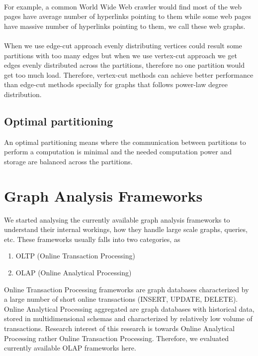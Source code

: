 \documentclass[12pt]{report}
\numberwithin{figure}{section}
\numberwithin{table}{section}
\begin{document}
\paragraph{}

For example, a common World Wide Web crawler would find most of the web pages have average number of hyperlinks pointing to them while some web pages have massive number of hyperlinks pointing to them, we call these web graphs\cite{WebGraphs}. 

\paragraph{}

When we use edge-cut approach evenly distributing vertices could result some partitions with too many edges but when we use vertex-cut approach we get edges evenly distributed across the partitions, therefore no one partition would get too much load. Therefore, vertex-cut methods can achieve better performance than edge-cut methods\cite{PowerGraph} specially for graphs that follows power-law degree distribution.

\subsection{Optimal partitioning}
	An optimal partitioning means where the communication between partitions to perform a computation is minimal and the needed computation power and storage are balanced across the partitions.

\section{Graph Analysis Frameworks}
We started analysing the currently available graph analysis frameworks to understand their internal workings, how they handle large scale graphs, queries, etc. These frameworks usually falls into two categories, as
\begin{enumerate}
\item OLTP (Online Transaction Processing)
\item OLAP (Online Analytical Processing)
\end{enumerate}

Online Transaction Processing frameworks are graph databases characterized by a large number of short online transactions (INSERT, UPDATE, DELETE). Online Analytical Processing aggregated are graph databases with historical data, stored in multidimensional schemas and characterized by relatively low volume of transactions. Research interest of this research is towards Online Analytical Processing rather Online Transaction Processing. Therefore, we evaluated currently available OLAP frameworks here.
\end{document}
